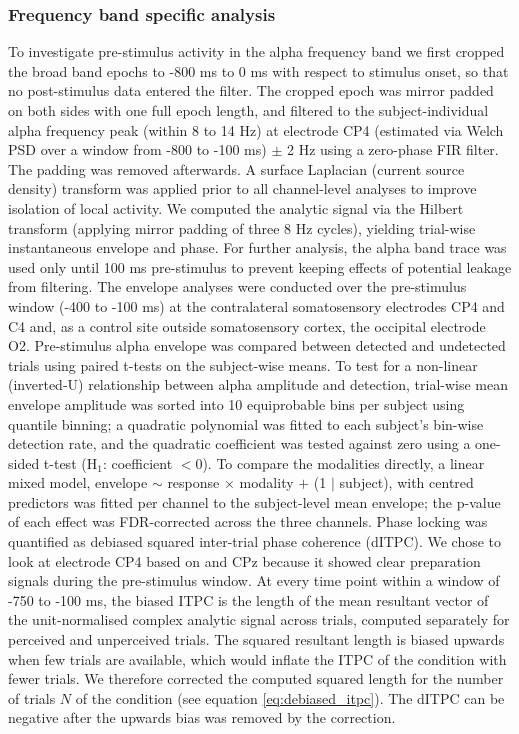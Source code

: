 \documentclass[11pt,a4paper,onecolumn]{article}
\begin{document}
\subsubsection*{Frequency band specific analysis}
\vspace{-7pt}

To investigate pre-stimulus activity in the alpha frequency band we first cropped the broad band epochs to -800 ms to 0 ms with respect to stimulus onset, so that no post-stimulus data entered the filter. The cropped epoch was mirror padded on both sides with one full epoch length, and filtered to the subject-individual alpha frequency peak (within 8 to 14 Hz) at electrode CP4 (estimated via Welch PSD over a window from -800 to -100 ms) $\pm$ 2 Hz using a zero-phase FIR filter. The padding was removed afterwards. A surface Laplacian (current source density) transform was applied prior to all channel-level analyses to improve isolation of local activity. We computed the analytic signal via the Hilbert transform (applying mirror padding of three 8 Hz cycles), yielding trial-wise instantaneous envelope and phase. 
For further analysis, the alpha band trace was used only until 100 ms pre-stimulus to prevent keeping effects of potential leakage from filtering. The envelope analyses were conducted over the pre-stimulus window (-400 to -100 ms) at the contralateral somatosensory electrodes CP4 and C4 and, as a control site outside somatosensory cortex, the occipital electrode O2. Pre-stimulus alpha envelope was compared between detected and undetected trials using paired t-tests on the subject-wise means. To test for a non-linear (inverted-U) relationship between alpha amplitude and detection, trial-wise mean envelope amplitude was sorted into 10 equiprobable bins per subject using quantile binning; a quadratic polynomial was fitted to each subject's bin-wise detection rate, and the quadratic coefficient was tested against zero using a one-sided t-test (H$_1$: coefficient $< 0$). To compare the modalities directly, a linear mixed model, envelope $\sim$ response $\times$ modality $+$ (1 $|$ subject), with centred predictors was fitted per channel to the subject-level mean envelope; the p-value of each effect was FDR-corrected across the three channels.
Phase locking was quantified as debiased squared inter-trial phase coherence (dITPC). We chose to look at electrode CP4 based on \cite{forschackAlphaBandBrainOscillations2017} and CPz because it showed clear preparation signals during the pre-stimulus window. At every time point within a window of -750 to -100 ms, the biased ITPC is the length of the mean resultant vector of the unit-normalised complex analytic signal across trials, computed separately for perceived and unperceived trials. The squared resultant length is biased upwards when few trials are available, which would inflate the ITPC of the condition with fewer trials. We therefore corrected the computed squared length for the number of trials $N$ of the condition (see equation \ref{eq:debiased_itpc}). The dITPC can be negative after the upwards bias was removed by the correction. 
\end{document}
